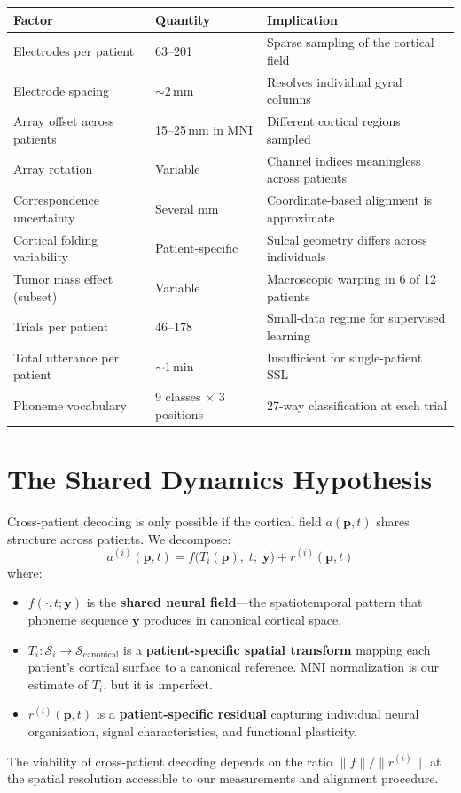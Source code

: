 \documentclass[11pt,letterpaper]{article}
\newcommand{\bfp}{\mathbf{p}}
\newcommand{\bfy}{\mathbf{y}}
\newcommand{\cS}{\mathcal{S}}
\begin{document}
\begin{table}[h]
\centering\small
\begin{tabular}{@{}lll@{}}
\toprule
\textbf{Factor} & \textbf{Quantity} & \textbf{Implication} \\
\midrule
Electrodes per patient & 63--201 & Sparse sampling of the cortical field \\
Electrode spacing & ${\sim}2$\,mm & Resolves individual gyral columns \\
Array offset across patients & 15--25\,mm in MNI & Different cortical regions sampled \\
Array rotation & Variable & Channel indices meaningless across patients \\
Correspondence uncertainty & Several mm & Coordinate-based alignment is approximate \\
Cortical folding variability & Patient-specific & Sulcal geometry differs across individuals \\
Tumor mass effect (subset) & Variable & Macroscopic warping in 6 of 12 patients \\
Trials per patient & 46--178 & Small-data regime for supervised learning \\
Total utterance per patient & ${\sim}1$\,min & Insufficient for single-patient SSL \\
Phoneme vocabulary & 9 classes $\times$ 3 positions & 27-way classification at each trial \\
\bottomrule
\end{tabular}
\end{table}

\section{The Shared Dynamics Hypothesis}

Cross-patient decoding is only possible if the cortical field $a(\bfp, t)$ shares structure across patients. We decompose:
\begin{equation}\label{eq:decomposition}
a^{(i)}(\bfp, t) = f\bigl(T_i(\bfp),\; t;\; \bfy\bigr) + r^{(i)}(\bfp, t)
\end{equation}
where:
\begin{itemize}[leftmargin=2em]
\item $f(\cdot, t; \bfy)$ is the \textbf{shared neural field}---the spatiotemporal pattern that phoneme sequence $\bfy$ produces in canonical cortical space.
\item $T_i: \cS_i \to \cS_{\text{canonical}}$ is a \textbf{patient-specific spatial transform} mapping each patient's cortical surface to a canonical reference. MNI normalization is our estimate of $T_i$, but it is imperfect.
\item $r^{(i)}(\bfp, t)$ is a \textbf{patient-specific residual} capturing individual neural organization, signal characteristics, and functional plasticity.
\end{itemize}
The viability of cross-patient decoding depends on the ratio $\|f\| / \|r^{(i)}\|$ at the spatial resolution accessible to our measurements and alignment procedure.
\end{document}
